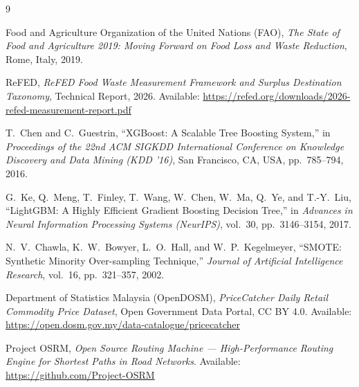 \documentclass[11pt,a4paper]{article}
\renewcommand{\_}{\oldunderscore\allowbreak}
\begin{document}
\begin{thebibliography}{9}

Food and Agriculture Organization of the United Nations (FAO), \emph{The State of Food and Agriculture 2019: Moving Forward on Food Loss and Waste Reduction}, Rome, Italy, 2019.

ReFED, \emph{ReFED Food Waste Measurement Framework and Surplus Destination Taxonomy}, Technical Report, 2026. Available: \url{https://refed.org/downloads/2026-refed-measurement-report.pdf}

T.~Chen and C.~Guestrin, ``XGBoost: A Scalable Tree Boosting System,'' in \emph{Proceedings of the 22nd ACM SIGKDD International Conference on Knowledge Discovery and Data Mining (KDD '16)}, San Francisco, CA, USA, pp.~785--794, 2016.

G.~Ke, Q.~Meng, T.~Finley, T.~Wang, W.~Chen, W.~Ma, Q.~Ye, and T.-Y.~Liu, ``LightGBM: A Highly Efficient Gradient Boosting Decision Tree,'' in \emph{Advances in Neural Information Processing Systems (NeurIPS)}, vol.~30, pp.~3146--3154, 2017.

N.~V.~Chawla, K.~W.~Bowyer, L.~O.~Hall, and W.~P.~Kegelmeyer, ``SMOTE: Synthetic Minority Over-sampling Technique,'' \emph{Journal of Artificial Intelligence Research}, vol.~16, pp.~321--357, 2002.

Department of Statistics Malaysia (OpenDOSM), \emph{PriceCatcher Daily Retail Commodity Price Dataset}, Open Government Data Portal, CC BY 4.0. Available: \url{https://open.dosm.gov.my/data-catalogue/pricecatcher}

Project OSRM, \emph{Open Source Routing Machine --- High-Performance Routing Engine for Shortest Paths in Road Networks}. Available: \url{https://github.com/Project-OSRM}

\end{thebibliography}
\end{document}
